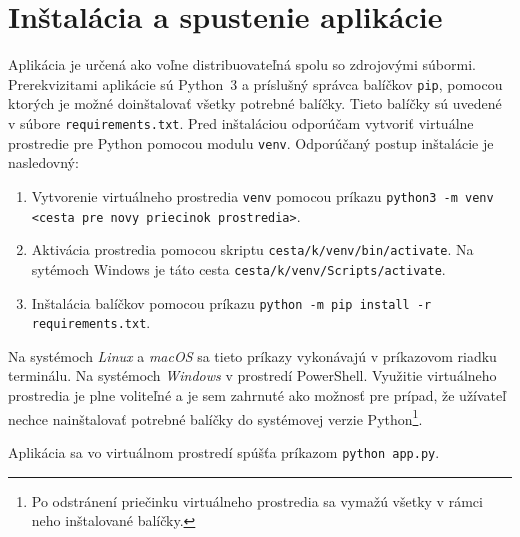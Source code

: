 
\chapter{Inštalácia a spustenie aplikácie} \label{sec:instalacia}
  Aplikácia je určená ako voľne distribuovateľná spolu so zdrojovými súbormi. Prerekvizitami aplikácie sú Python~3 a príslušný správca balíčkov \texttt{pip},
  pomocou ktorých je možné doinštalovať všetky potrebné balíčky. Tieto balíčky sú uvedené v súbore \texttt{requirements.txt}. Pred inštaláciou odporúčam
  vytvoriť virtuálne prostredie pre Python pomocou modulu \texttt{venv}. Odporúčaný postup inštalácie je nasledovný:
  \begin{enumerate}
    \item Vytvorenie virtuálneho prostredia \texttt{venv} pomocou príkazu \texttt{python3 -m venv <cesta pre novy priecinok prostredia>}.
    \item Aktivácia prostredia pomocou skriptu \texttt{cesta/k/venv/bin/activate}. Na sytémoch Windows je táto cesta \texttt{cesta/k/venv/Scripts/activate}.
    \item Inštalácia balíčkov pomocou príkazu \texttt{python -m pip install -r requirements.txt}.
  \end{enumerate}
  Na systémoch \emph{Linux} a \emph{macOS} sa tieto príkazy vykonávajú v príkazovom riadku terminálu. Na systémoch \emph{Windows} v prostredí PowerShell.
  Využitie virtuálneho prostredia je plne voliteľné a je sem zahrnuté ako možnosť pre prípad, že užívateľ nechce nainštalovať potrebné balíčky do systémovej
  verzie Python\footnote{Po odstránení priečinku virtuálneho prostredia sa vymažú všetky v rámci neho inštalované balíčky.}.

  Aplikácia sa vo virtuálnom prostredí spúšťa príkazom \texttt{python app.py}.

